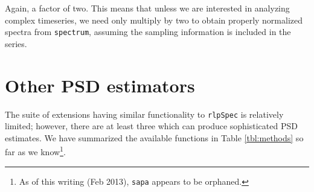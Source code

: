 \documentclass[12pt]{article}\usepackage{graphicx, color}
\newcommand{\Rcmd}[1]{\texttt{#1}}
\newcommand{\rlp}[0]{\Rcmd{rlpSpec}}
\begin{document}
Again, a factor of two. 
This means that unless we are interested in analyzing complex
timeseries, we need only multiply by two 
to obtain properly normalized spectra
from \Rcmd{spectrum}, 
assuming the sampling information is included in the series.

\section{Other PSD estimators}
The suite of extensions having
similar functionality to \rlp{}
is relatively limited; however, there are at least three which
can produce sophisticated PSD estimates.   We have
summarized the available functions in Table \ref{tbl:methods}
so far as we know\footnote{
As of this writing (Feb 2013), \Rcmd{sapa} appears to be orphaned.
}.



\pagebreak



\printindex
\end{document}
